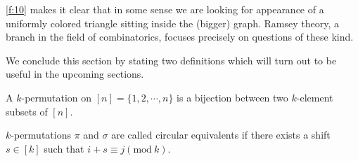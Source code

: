 \begin{remark}
\cref{f:10} makes it clear that in some sense we are looking for appearance of a uniformly colored triangle sitting inside the (bigger) graph. Ramsey theory, a branch in the field of combinatorics, focuses precisely on questions of these kind.
\end{remark}

We conclude this section by stating two definitions which will turn out to be useful in the upcoming sections.
\begin{definition}[$k$-Permutation]
A $k$-permutation on $[n]=\{1,2,\cdots,n\}$ is a bijection between two $k$-element subsets of $[n]$. 
\end{definition}
\begin{definition}
	$k$-permutations  $\pi$ and $\sigma$ are called circular equivalents if there exists a shift  $s\in [k]$ such that  $i+s\equiv j(\text{mod} \ k)$.
\end{definition}
